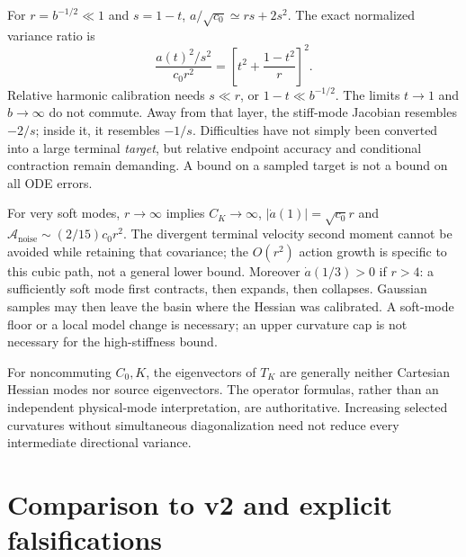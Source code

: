 \documentclass[11pt,letterpaper]{article}
\begin{document}
For $r=b^{-1/2}\ll1$ and $s=1-t$, $a/\sqrt{c_0}\simeq rs+2s^2$. The exact normalized variance ratio is
\begin{equation}
\frac{a(t)^2/s^2}{c_0r^2}
=\left[t^2+\frac{1-t^2}{r}\right]^2.
\label{eq:layer}
\end{equation}
Relative harmonic calibration needs $s\ll r$, or $1-t\ll b^{-1/2}$. The limits $t\to1$ and $b\to\infty$ do not commute. Away from that layer, the stiff-mode Jacobian resembles $-2/s$; inside it, it resembles $-1/s$. Difficulties have not simply been converted into a large terminal \emph{target}, but relative endpoint accuracy and conditional contraction remain demanding. A bound on a sampled target is not a bound on all ODE errors.

For very soft modes, $r\to\infty$ implies $C_K\to\infty$, $|\dot a(1)|=\sqrt{c_0}r$ and $\mathcal A_{\mathrm{noise}}\sim(2/15)c_0r^2$. The divergent terminal velocity second moment cannot be avoided while retaining that covariance; the $O(r^2)$ action growth is specific to this cubic path, not a general lower bound. Moreover $\dot a(1/3)>0$ if $r>4$: a sufficiently soft mode first contracts, then expands, then collapses. Gaussian samples may then leave the basin where the Hessian was calibrated. A soft-mode floor or a local model change is necessary; an upper curvature cap is not necessary for the high-stiffness bound.

For noncommuting $C_0,K$, the eigenvectors of $T_K$ are generally neither Cartesian Hessian modes nor source eigenvectors. The operator formulas, rather than an independent physical-mode interpretation, are authoritative. Increasing selected curvatures without simultaneous diagonalization need not reduce every intermediate directional variance.

\section{Comparison to v2 and explicit falsifications}
\label{sec:comparison}
\end{document}
